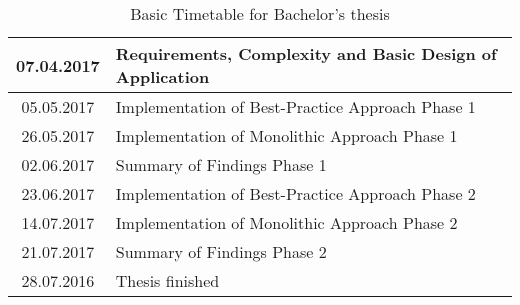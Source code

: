 \begin{table}
\begin{tabular}{|c|l|} \hline
07.04.2017 & Requirements, Complexity and Basic Design of Application \\ \hline
05.05.2017 & Implementation of Best-Practice Approach Phase 1 \\ \hline
26.05.2017 & Implementation of Monolithic Approach Phase 1 \\ \hline
02.06.2017 & Summary of Findings Phase 1 \\ \hline
23.06.2017 & Implementation of Best-Practice Approach Phase 2 \\ \hline
14.07.2017 & Implementation of Monolithic Approach Phase 2 \\ \hline
21.07.2017 & Summary of Findings Phase 2 \\ \hline
28.07.2016 & Thesis finished \\ \hline
\end{tabular}

\caption{Basic Timetable for Bachelor's thesis}
\end{table}


